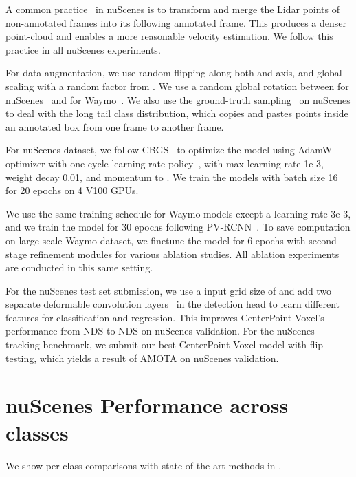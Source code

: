 \documentclass[final]{cvpr}
\begin{document}
A common practice~\cite{zhu2019classbalanced, yang20203dssd, vora2019pointpainting, caesar2019nuscenes} in nuScenes is to transform and merge the Lidar points of non-annotated frames into its following annotated frame.
This produces a denser point-cloud and enables a more reasonable velocity estimation.
We follow this practice in all nuScenes experiments. 

For data augmentation, we use random flipping along both  and  axis,
and global scaling with a random factor from .
We use a random global rotation between  for nuScenes~\cite{zhu2019classbalanced} and  for Waymo~\cite{pvrcnn}.
We also use the ground-truth sampling~\cite{yan2018second} on nuScenes to deal with the long tail class distribution, which copies and pastes points inside an annotated box from one frame to another frame.  

For nuScenes dataset, we follow CBGS~\cite{zhu2019classbalanced} to optimize the model using AdamW~\cite{adamW} optimizer with one-cycle learning rate policy~\cite{one_cycle},
with max learning rate 1e-3, weight decay 0.01, and momentum  to .
We train the models with batch size 16 for 20 epochs on 4 V100 GPUs.

We use the same training schedule for Waymo models except a learning rate 3e-3, and we train the model for 30 epochs following PV-RCNN~\cite{pvrcnn}. 
To save computation on large scale Waymo dataset, we finetune the model for 6 epochs with second stage refinement modules for various ablation studies. 
All ablation experiments are conducted in this same setting.

For the nuScenes test set submission, we use a input grid size of  and add two separate deformable convolution layers~\cite{dai2017deformable} in the detection head to learn different features for classification and regression.  
This improves CenterPoint-Voxel's performance from  NDS to  NDS on nuScenes validation. 
For the nuScenes tracking benchmark, we submit our best CenterPoint-Voxel model with flip testing, which yields a result of  AMOTA on nuScenes validation.  

\section{nuScenes Performance across classes}
We show per-class comparisons with state-of-the-art methods in . 
\end{document}
